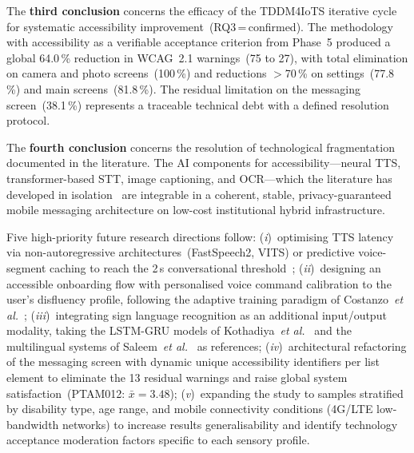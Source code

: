 \documentclass[journal]{IEEEtran}
\begin{document}
	The \textbf{third conclusion} concerns the efficacy of the
	TDDM4IoTS iterative cycle for systematic accessibility
	improvement~(RQ3\,=\,confirmed).
	The methodology~\cite{guerrero2020} with accessibility as a
	verifiable acceptance criterion from Phase~5 produced a global
	64.0\,\% reduction in WCAG~2.1 warnings~(75 to 27), with total
	elimination on camera and photo screens~(100\,\%) and reductions
	$>$70\,\% on settings~(77.8\,\%) and main screens~(81.8\,\%).
	The residual limitation on the messaging screen~(38.1\,\%)
	represents a traceable technical debt with a defined resolution
	protocol.
	
	The \textbf{fourth conclusion} concerns the resolution of
	technological fragmentation documented in the literature.
	The AI components for accessibility---neural TTS, transformer-based
	STT, image captioning, and OCR---which the literature has
	developed in isolation~\cite{tan2021,baevski2020,radford2023,ming2022,mukherjee2023}
	are integrable in a coherent, stable, privacy-guaranteed mobile
	messaging architecture on low-cost institutional hybrid
	infrastructure.
	
	Five high-priority future research directions follow:
	(\textit{i})~optimising TTS latency via non-autoregressive
	architectures~(FastSpeech2, VITS) or predictive voice-segment
	caching to reach the 2\,s conversational threshold~\cite{tan2021};
	(\textit{ii})~designing an accessible onboarding flow with
	personalised voice command calibration to the user's disfluency
	profile, following the adaptive training paradigm of
	Costanzo~\textit{et al.}~\cite{costanzo2023};
	(\textit{iii})~integrating sign language recognition as an
	additional input/output modality, taking the LSTM-GRU models
	of Kothadiya~\textit{et al.}~\cite{kothadiya2022} and the
	multilingual systems of Saleem~\textit{et al.}~\cite{saleem2023}
	as references;
	(\textit{iv})~architectural refactoring of the messaging screen
	with dynamic unique accessibility identifiers per list element
	to eliminate the 13 residual warnings and raise global system
	satisfaction~(PTAM012: $\bar{x}{=}3.48$);
	(\textit{v})~expanding the study to samples stratified by
	disability type, age range, and mobile connectivity conditions
	(4G/LTE low-bandwidth networks) to increase results
	generalisability and identify technology acceptance moderation
	factors specific to each sensory profile.
	
\end{document}
